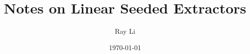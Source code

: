 \documentclass[12pt]{article}
\begin{document}
\title{Notes on Linear Seeded Extractors}
\author{Ray Li}
\date{\today}
\maketitle

\tableofcontents





\end{document}
